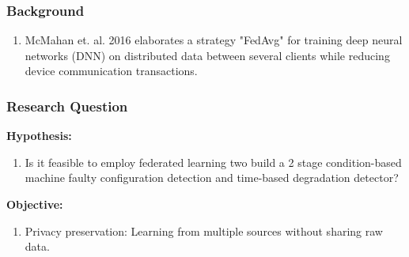 \documentclass[9pt]{beamer}
\begin{document}
\begin{frame}
\frametitle{Background}
\subtitle{Federated Algorithm}

\begin{enumerate}
    \item McMahan et. al. 2016 elaborates a strategy "FedAvg" for training deep neural networks (DNN) on distributed data between several clients while reducing device communication transactions. 

\end{enumerate}


\subtitle{Fault detection}



\end{frame}




\begin{frame}
\frametitle{Research Question}



\textbf{Hypothesis:}




\begin{enumerate}
    \item Is it feasible to employ federated learning two build a 2 stage condition-based machine faulty configuration detection and time-based degradation detector?

    
\end{enumerate}

\textbf{Objective:}

\begin{enumerate}
    \item Privacy preservation: Learning from multiple sources without sharing raw data.

    
\end{enumerate}



\end{frame}
\end{document}
